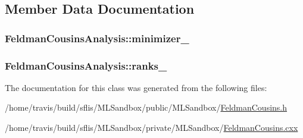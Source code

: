 \subsection{Member Data Documentation}
\hypertarget{classFeldmanCousinsAnalysis_a4a16f04a45c379c10b12f76714116226}{
\subsubsection[{minimizer\-\_\-}]{ Feldman\-Cousins\-Analysis\-::minimizer\-\_\-}}\label{classFeldmanCousinsAnalysis_a4a16f04a45c379c10b12f76714116226}
\hypertarget{classFeldmanCousinsAnalysis_a2a83aefd21bd62772ba9b8ef2a0afe37}{
\subsubsection[{ranks\-\_\-}]{ Feldman\-Cousins\-Analysis\-::ranks\-\_\-}}\label{classFeldmanCousinsAnalysis_a2a83aefd21bd62772ba9b8ef2a0afe37}


The documentation for this class was generated from the following files\-:\begin{DoxyCompactItemize}
\item 
/home/travis/build/sflis/\-M\-L\-Sandbox/public/\-M\-L\-Sandbox/\hyperlink{FeldmanCousins_8h}{Feldman\-Cousins.\-h}\item 
/home/travis/build/sflis/\-M\-L\-Sandbox/private/\-M\-L\-Sandbox/\hyperlink{MLSandbox_2FeldmanCousins_8cxx}{Feldman\-Cousins.\-cxx}\end{DoxyCompactItemize}

